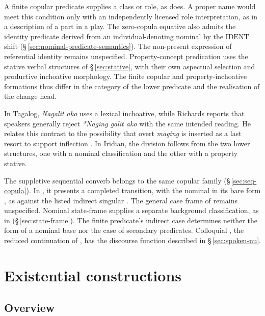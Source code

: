 A finite copular predicate supplies a class or role, as 
does. A proper name would meet this condition only with an independently
licensed role interpretation, as in a description of a part in a play.
The zero-copula equative also admits the identity predicate derived
from an individual-denoting nominal by the $\mathrm{IDENT}$ shift
(§\,\ref{sec:nominal-predicate-semantics}). The non-present expression
of referential identity remains unspecified. Property-concept predication
uses the stative verbal structures of §\,\ref{sec:stative}, with their
own aspectual selection and productive inchoative morphology. The
finite copular and property-inchoative formations thus differ in
the category of the lower predicate and the realisation of the change head.

In Tagalog, \textit{Nagalit ako}  uses a lexical
inchoative, while Richards reports that speakers generally reject
\textit{*Naging galit ako} with the same intended reading. He relates
this contrast to the possibility that overt \textit{maging} is inserted
as a last resort to support inflection \cite[188--189]{richards2009tagalog}.
In Iridian, the division follows from the two lower structures, one with
a nominal classification and the other with a property stative.

The suppletive sequential converb  belongs to the same
copular family (§\,\ref{sec:seq-copula}). In 
, it presents a completed transition,
with the nominal in its bare form , as against the listed
indirect singular . The general case frame of 
remains unspecified. Nominal state-frame  supplies a separate
background classification, as in  
(§\,\ref{sec:state-frame}). The finite predicate's indirect case
determines neither the form of a nominal  base nor the case
of secondary predicates. Colloquial , the reduced continuation
of , has the discourse function described in
§\,\ref{sec:spoken-nu}.

\section{Existential constructions}
\label{sec:existential-constructions}

\subsection{Overview}
\label{sec:existential-overview}%
\label{sec:jec}%
\label{sec:zad}%
\label{sec:jec-zad}%

